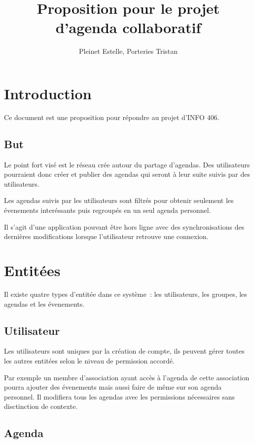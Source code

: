 \documentclass[a4paper,12pt]{article}
\title{Proposition pour le projet d'agenda collaboratif}
\author{Pleinet Estelle, Porteries Tristan}
\begin{document}
\maketitle

\tableofcontents

\section{Introduction}

Ce document est une proposition pour répondre au projet d'INFO 406.

\subsection{But}

Le point fort visé est le réseau crée autour du partage d'agendas.
Des utilisateurs pourraient donc créer et publier des agendas qui seront à leur suite suivis par des utilisateurs.

Les agendas suivis par les utilisateurs sont filtrés pour obtenir seulement les évenements interéssants puis regroupés en un seul agenda personnel.

Il s'agit d'une application pouvant être hors ligne avec des synchronisations des dernières modifications lorsque l'utilisateur retrouve une connexion.

\section{Entitées}

Il existe quatre types d'entitée dans ce système~: les utilisateurs, les groupes, les agendas et les évenements.

\subsection{Utilisateur}

Les utilisateurs sont uniques par la création de compte, ils peuvent gérer toutes les autres entitées selon le niveau de permission accordé.

Par exemple un membre d'association ayant accès à l'agenda de cette association pourra ajouter des évenements mais aussi faire de même sur son agenda personnel. Il modifiera tous les agendas avec les permissions nécessaires sans disctinction de contexte.

\subsection{Agenda}
\end{document}
